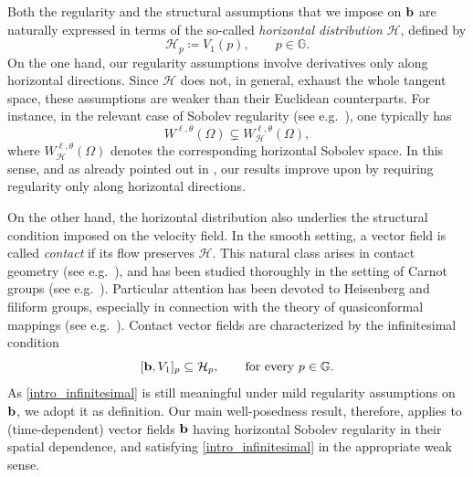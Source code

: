\documentclass[11pt]{amsart}
\newcommand{\hhh}{{\mathcal{H}}}
\newcommand{\bb}{{\bf {b}}} %
\newcommand{\Om}{\Omega}
\DeclarePairedDelimiter{\abs}{\lvert}{\rvert}
\theoremstyle{plain}
\theoremstyle{definition}
\theoremstyle{remark}
\numberwithin{equation}{section}
\begin{document}
\medskip
Both the regularity and the structural assumptions that we impose on $\bb$ are naturally expressed in terms of the so-called \emph{horizontal distribution} $\hhh$, defined by
\begin{equation*}
\hhh_p\coloneqq V_1(p),\qquad p\in\mathbb G.
\end{equation*}
 On the one hand, our regularity assumptions involve derivatives only along horizontal directions. Since $\hhh$ does not, in general, exhaust the whole tangent space, these assumptions are weaker than their Euclidean counterparts. For instance, in the relevant case of Sobolev regularity (see e.g.~\cite{MR4986764}), one typically has
\begin{equation*}
W^{\ell,\theta}(\Om)\subsetneq W_{\mathcal H}^{\ell,\theta}(\Om),
\end{equation*}
where $W_{\mathcal H}^{\ell,\theta}(\Om)$ denotes the corresponding horizontal Sobolev space. In this sense, and as already pointed out in \cite{dpl1}, our results improve upon \cite{MR1022305} by requiring regularity only along horizontal directions.

\medskip
On the other hand, the horizontal distribution also underlies the structural condition imposed on the velocity field. In the smooth setting, a vector field is called \emph{contact} if its flow preserves $\hhh$. This natural class arises in contact geometry (see e.g.~\cite{Libermann,MR266258}), and has been studied thoroughly in the setting of Carnot groups (see e.g.~\cite{MR2395129,MR2917692}). Particular attention has been devoted to Heisenberg and filiform groups, especially in connection with the theory of quasiconformal mappings (see e.g.~\cite{MR788413,MR1317384,MR2016308}). Contact vector fields are characterized by the infinitesimal condition
\begin{equation}\label{intro_infinitesimal}
    [\bb,V_1]_p\subseteq\hhh_p,\qquad\text{for every $p\in \mathbb G$}.
\end{equation}
As \eqref{intro_infinitesimal} is still meaningful under mild regularity assumptions on $\bb$, we adopt it as definition. 
Our main well-posedness result, therefore, applies to (time-dependent) vector fields $\bb$ having horizontal Sobolev regularity in their spatial dependence, and satisfying \eqref{intro_infinitesimal} in the appropriate weak sense.
\end{document}
